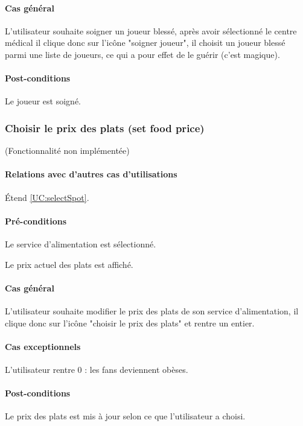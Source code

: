 \paragraph{Cas général}
L'utilisateur souhaite soigner un joueur blessé, après avoir sélectionné le centre médical il clique donc sur l'icône "soigner joueur", il choisit un joueur blessé parmi une liste de joueurs, ce qui a pour effet de le guérir (c'est magique).
\paragraph{Post-conditions}
\begin{list}{}{\leftmargin=1.5em}
\item{Le joueur est soigné.}
\end{list}

\subsubsection{Choisir le prix des plats (set food price)}
\label{UC:setFoodPrice}
(Fonctionnalité non implémentée)
\paragraph{Relations avec d'autres cas d'utilisations}
Étend \ref{UC:selectSpot}.
\paragraph{Pré-conditions}
\begin{list}{}{\leftmargin=1.5em}
\item{Le service d'alimentation est sélectionné.}
\item{Le prix actuel des plats est affiché.}
\end{list}
\paragraph{Cas général}
L'utilisateur souhaite modifier le prix des plats de son service d'alimentation, il clique donc sur l'icône "choisir le prix des plats" et rentre un entier.
\paragraph{Cas exceptionnels}
L'utilisateur rentre 0 : les fans deviennent obèses. 
\paragraph{Post-conditions}
\begin{list}{}{\leftmargin=1.5em}
\item{Le prix des plats est mis à jour selon ce que l'utilisateur a choisi.}
\end{list}


